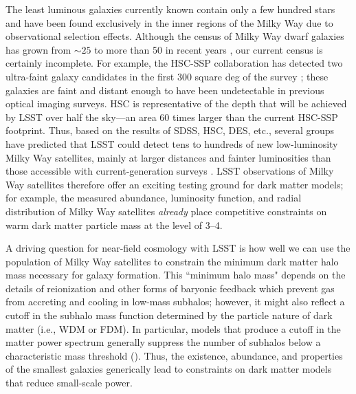 \documentclass[modern,linenumbers]{aastex62}
\newcommand{\Comment}[3]{\textcolor{#1}{(#2: #3)}}
\newcommand{\ADW}[1]{\Comment{blue}{ADW}{#1}} %
\newcommand{\EON}[1]{\Comment{purple}{EON}{#1}} %
\newcommand{\AHGP}[1]{\Comment{cyan}{AHGP}{#1}} %
\begin{document}
The least luminous galaxies currently known contain only a few hundred stars and have been found exclusively in the inner regions of the Milky Way due to observational selection effects. Although the census of Milky Way dwarf galaxies has grown from $\sim25$ to more than 50 in recent years \citep[e.g., with DES;][]{Bechtol:2015, Koposov:2015, Drlica-Wagner:2015}, our current census is certainly incomplete.
For example, the HSC-SSP collaboration has detected two ultra-faint galaxy candidates in the first 300 square deg of the survey \citep{1609.04346,1704.05977}; these galaxies are faint and distant enough to have been undetectable in previous optical imaging surveys. HSC is representative of the depth that will be achieved by LSST over half the sky---an area 60 times larger than the current HSC-SSP footprint. Thus, based on the results of SDSS, HSC, DES, etc., several groups have predicted that LSST could detect %
tens to hundreds of new low-luminosity Milky Way satellites, mainly at larger distances and fainter luminosities than those accessible with current-generation surveys \citep{Hargis:2014,Newton:2018,Jethwa:2018,Nadler:2018,Kim:2017iwr}. LSST observations of Milky Way satellites therefore offer an exciting testing ground for dark matter models; for example, the measured abundance, luminosity function, and radial distribution of Milky Way satellites \emph{already} place competitive constraints on warm dark matter particle mass at the level of 3--4\keV \citep[e.g.,][]{Jethwa:2018,Kim:2017iwr}.%

\vspace{1em} 

A driving question for near-field cosmology with LSST is how well we can use the population of Milky Way satellites to constrain the minimum dark matter halo mass necessary for galaxy formation. %
This ``minimum halo mass" depends on the details of reionization and other forms of baryonic feedback which prevent gas from accreting and cooling in low-mass subhalos; however, it might also reflect a cutoff in the subhalo mass function determined by the particle nature of dark matter (i.e., WDM or FDM). In particular, models that produce a cutoff in the matter power spectrum generally suppress the number of subhalos below a characteristic mass threshold (). Thus, the existence, abundance, and properties of the smallest galaxies generically lead to constraints on dark matter models that reduce small-scale power.
\end{document}
